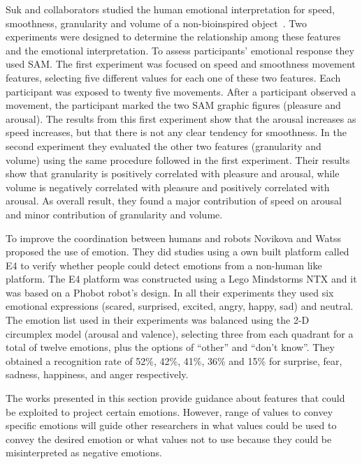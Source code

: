 Suk and collaborators studied the human emotional interpretation for speed, smoothness, granularity and volume of a non-bioinspired object~\cite{NAM2014}. %
Two experiments were designed to determine the relationship among these features and the emotional interpretation. To assess participants' emotional response they used SAM. The first experiment was focused on speed and smoothness movement features, selecting five different values for each one of these two features. Each participant was exposed to twenty five movements. After a participant observed a movement, the participant marked the two SAM graphic figures (pleasure and arousal).
The results from this first experiment show that the arousal increases as speed increases, but that there is not any clear tendency for smoothness. In the second experiment they evaluated the other two features (granularity and volume) using the same procedure followed in the first experiment. Their results show that granularity is positively correlated with pleasure and arousal, while volume is negatively correlated with pleasure and positively correlated with arousal. As overall result, they found a major contribution of speed on arousal and minor contribution of granularity and volume.

To improve the coordination between humans and robots Novikova and Watss~\cite{Novika2015} proposed the use of emotion. They did studies using a own built platform called E4 to verify whether people could detect emotions from a non-human like platform. The E4 platform was constructed using a Lego Mindstorms NTX and it was based on a Phobot robot's design. In all their experiments they used six emotional expressions (scared, surprised, excited, angry, happy, sad) and neutral. The emotion list used in their experiments was balanced using the 2-D circumplex model (arousal and valence), selecting three from each quadrant for a total of twelve emotions, plus the options of ``other'' and ``don't know''. They obtained a recognition rate of 52\%, 42\%, 41\%, 36\% and 15\% for surprise, fear, sadness, happiness, and anger respectively.

The works presented in this section provide guidance about features that could be exploited to project certain emotions. However, range of values to convey specific emotions will guide other researchers in what values could be used to convey the desired emotion or what values not to use because they could be misinterpreted as negative emotions.  %

